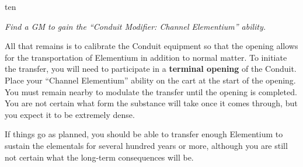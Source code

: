 \documentclass[notebook]{elementals}
\begin{document}
\begin{page}{ten}

\emph{Find a GM to gain the ``Conduit Modifier: Channel Elementium'' ability.}

All that remains is to calibrate the Conduit equipment so that the opening allows for the transportation of Elementium in addition to normal matter. To initiate the transfer, you will need to participate in a \textbf{terminal opening} of the Conduit. Place your ``Channel Elementium'' ability on the cart at the start of the opening. You must remain nearby to modulate the transfer until the opening is completed. You are not certain what form the substance will take once it comes through, but you expect it to be extremely dense.

If things go as planned, you should be able to transfer enough Elementium to sustain the elementals for several hundred years or more, although you are still not certain what the long-term consequences will be.

\end{page}

\endnotebook
\end{document}

